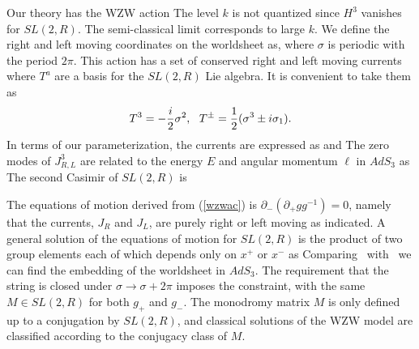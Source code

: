 Our theory has the WZW action
The level $k$ is not quantized since $H^3$ vanishes for $SL(2,R)$. 
The semi-classical limit corresponds to large $k$. 
We define the right and left moving coordinates on the
worldsheet as, 
where $\sigma$ is periodic with the period $2\pi$.
This action has a set of conserved right and left moving currents
where $T^a$ are a basis for the $SL(2,R)$ Lie algebra. It is convenient to 
take them as
$$T^3 = -{i\over 2} \sigma^2,~~
T^{\pm} = {1 \over 2}( \sigma^3 \pm i \sigma_1).$$
In terms of our parameterization, the currents are expressed as 
and 
The zero modes of $J^3_{R,L}$ are related to the energy $E$ and angular
momentum $\ell $ 
in $AdS_3$ as
The second Casimir of $SL(2,R)$ is 

The equations of motion derived from (\ref{wzwac}) is
$\partial_-(\partial_+ g g^{-1}) = 0$, namely that the currents, 
$J_R$ and $J_L$, are purely right or left moving as indicated. 
A general solution of the equations of motion for $SL(2,R)$ is 
the product of two group elements each of which depends only on 
$x^+$ or $x^-$ as
Comparing \genso\ with \elem\ we can find the embedding of the worldsheet 
in $AdS_3$. 
The requirement that the string
is closed under $\sigma \rightarrow \sigma + 2\pi$
imposes the constraint,
with the same $M \in SL(2,R)$ for both $g_+$ and $g_-$. 
The monodromy matrix $M$ is only defined up to a conjugation
by $SL(2,R)$, 
and classical solutions of the WZW model are 
classified according to the conjugacy class of $M$. 


